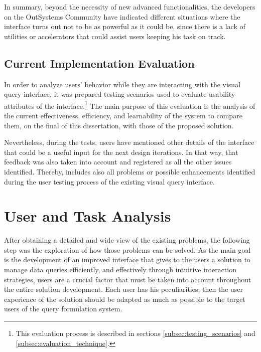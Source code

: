 In summary, beyond the necessity of new advanced functionalities, the developers on the OutSystems Community have indicated different situations where the interface turns out not to be as powerful as it could be, since there is a lack of utilities or accelerators that could assist users keeping his task on track.

\subsection{Current Implementation Evaluation}
\label{sec:current_implementation_evaluation}

In order to analyze users' behavior while they are interacting with the visual query interface, it was prepared testing scenarios used to evaluate usability attributes of the interface.\footnote{This evaluation process is described in sections \ref{subsec:testing_scenarios} and \ref{subsec:evaluation_technique}.} The main purpose of this evaluation is the analysis of the current effectiveness, efficiency, and learnability of the system to compare them, on the final of this dissertation, with those of the proposed solution. 

Nevertheless, during the tests, users have mentioned other details of the interface that could be a useful input for the next design iterations. In that way, that feedback was also taken into account and registered as all the other issues identified. Thereby,  includes also all problems or possible enhancements identified during the user testing process of the existing visual query interface.


\section{User and Task Analysis}
\label{sec:user_and_task_analysis}

After obtaining a detailed and wide view of the existing problems, the following step was the exploration of how those problems can be solved. As the main goal is the development of an improved interface that gives to the users a solution to manage data queries efficiently, and effectively through intuitive interaction strategies, users are a crucial factor that must be taken into account throughout the entire solution development. Each user has his peculiarities, then the user experience of the solution should be adapted as much as possible to the target users of the query formulation system.

